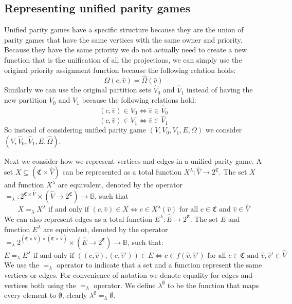 \subsection{Representing unified parity games}
Unified parity games have a specific structure because they are the union of parity games that have the same vertices with the same owner and priority. Because they have the same priority we do not actually need to create a new function that is the unification of all the projections, we can simply use the original priority assignment function because the following relation holds:
\[ \Omega(c,\hat{v}) = \hat{\Omega}(\hat{v}) \]
Similarly we can use the original partition sets $\hat{V}_0$ and $\hat{V}_1$ instead of having the new partition $V_0$ and $V_1$ because the following relations hold:
\[ (c,\hat{v}) \in V_0 \iff \hat{v}\in \hat{V}_0 \]
\[ (c,\hat{v}) \in V_1 \iff \hat{v}\in \hat{V}_1 \]
So instead of considering unified parity game $(V,V_0,V_1,E,\Omega)$ we consider $(V,\hat{V}_0,\hat{V}_1,E,\hat{\Omega})$. 

Next we consider how we represent vertices and edges in a unified parity game. A set $X \subseteq (\mathfrak{C} \times \hat{V})$ can be represented as a total function $X^\lambda : \hat{V} \rightarrow 2^\mathfrak{C}$. The set $X$ and function $X^\lambda$ are equivalent, denoted by the operator $=_\lambda: 2^{\mathfrak{C} \times \hat{V}} \times (\hat{V} \rightarrow 2^\mathfrak{C}) \rightarrow \mathbb{B}$, such that
\[ X =_\lambda X^\lambda \text{ if and only if } (c,\hat{v}) \in X \iff c \in X^\lambda(\hat{v})\text{ for all }c \in \mathfrak{C}\text{ and }\hat{v} \in \hat{V} \]
We can also represent edges as a total function $E^\lambda : \hat{E} \rightarrow 2^\mathfrak{C}$. The set $E$ and function $E^\lambda$ are equivalent, denoted by the operator $=_\lambda 2^{(\mathfrak{C} \times \hat{V}) \times(\mathfrak{C} \times \hat{V})} \times (\hat{E} \rightarrow 2^\mathfrak{C}) \rightarrow \mathbb{B}$, such that:
\[ E =_\lambda E^\lambda \text{ if and only if } ((c,\hat{v}),(c,\hat{v}')) \in E \iff c \in f(\hat{v},\hat{v}')\text{ for all }c \in \mathfrak{C}\text{ and }\hat{v},\hat{v}' \in \hat{V} \]
We use the $=_\lambda$ operator to indicate that a set and a function represent the same vertices or edges. For convenience of notation we denote equality for edges and vertices both using the $=_\lambda$ operator. We define $\lambda^\emptyset$ to be the function that maps every element to $\emptyset$, clearly $\lambda^\emptyset =_\lambda \emptyset$. 

